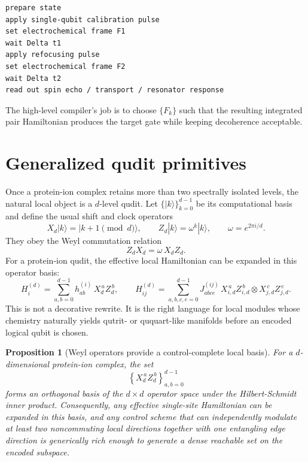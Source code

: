 \documentclass[11pt]{report}
\newcommand{\ham}{Hamiltonian}
\newcommand{\Xd}{X_d}
\newcommand{\Zd}{Z_d}
\newtheorem{proposition}[theorem]{Proposition}
\theoremstyle{definition}
\begin{document}
\begin{verbatim}
prepare state
apply single-qubit calibration pulse
set electrochemical frame F1
wait Delta t1
apply refocusing pulse
set electrochemical frame F2
wait Delta t2
read out spin echo / transport / resonator response
\end{verbatim}

The high-level compiler's job is to choose $\{F_k\}$ such that the resulting integrated pair \ham{} produces the target gate while keeping decoherence acceptable.

\section{Generalized qudit primitives}
Once a protein-ion complex retains more than two spectrally isolated levels, the natural local object is a $d$-level qudit. Let $\{|k\rangle\}_{k=0}^{d-1}$ be its computational basis and define the usual shift and clock operators
\begin{equation}
\Xd |k\rangle = |k+1 \!\!\!\pmod d\rangle,
\qquad
\Zd |k\rangle = \omega^k |k\rangle,
\qquad
\omega = e^{2\pi i/d}.
\end{equation}
They obey the Weyl commutation relation
\begin{equation}
\Zd \Xd = \omega \, \Xd \Zd.
\end{equation}
For a protein-ion qudit, the effective local Hamiltonian can be expanded in this operator basis:
\begin{equation}
H_i^{(d)} = \sum_{a,b=0}^{d-1} h_{ab}^{(i)} \, \Xd^{\,a}\Zd^{\,b},
\qquad
H_{ij}^{(d)} = \sum_{a,b,c,e=0}^{d-1}
J_{abce}^{(ij)} \, X_{i,d}^{\,a} Z_{i,d}^{\,b}\otimes X_{j,d}^{\,c} Z_{j,d}^{\,e}.
\end{equation}
This is not a decorative rewrite. It is the right language for local modules whose chemistry naturally yields qutrit- or ququart-like manifolds before an encoded logical qubit is chosen.

\begin{proposition}[Weyl operators provide a control-complete local basis]
For a $d$-dimensional protein-ion complex, the set
\[
\left\{\Xd^{\,a}\Zd^{\,b}\right\}_{a,b=0}^{d-1}
\]
forms an orthogonal basis of the $d\times d$ operator space under the Hilbert-Schmidt inner product. Consequently, any effective single-site Hamiltonian can be expanded in this basis, and any control scheme that can independently modulate at least two noncommuting local directions together with one entangling edge direction is generically rich enough to generate a dense reachable set on the encoded subspace.
\end{proposition}
\end{document}
